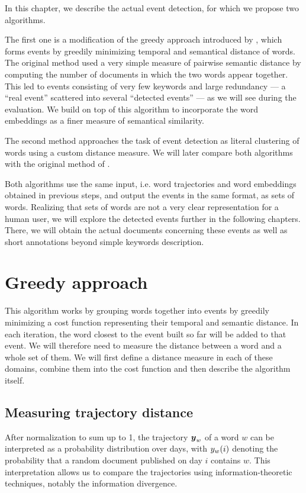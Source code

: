 In this chapter, we describe the actual event detection, for which we propose two algorithms.

The first one is a modification of the greedy approach introduced by \cite{event-detection}, which forms events by greedily minimizing temporal and semantical distance of words. The original method used a very simple measure of pairwise semantic distance by computing the number of documents in which the two words appear together. This led to events consisting of very few keywords and large redundancy --- a ``real event'' scattered into several ``detected events'' --- as we will see during the evaluation. We build on top of this algorithm to incorporate the word embeddings as a finer measure of semantical similarity.

The second method approaches the task of event detection as literal clustering of words using a custom distance measure. We will later compare both algorithms with the original method of \cite{event-detection}.

Both algorithms use the same input, i.e. word trajectories and word embeddings obtained in previous steps, and output the events in the same format, as sets of words. Realizing that sets of words are not a very clear representation for a human user, we will explore the detected events further in the following chapters. There, we will obtain the actual documents concerning these events as well as short annotations beyond simple keywords description.


\section{Greedy approach}
This algorithm works by grouping words together into events by greedily minimizing a cost function representing their temporal and semantic distance. In each iteration, the word closest to the event built so far will be added to that event. We will therefore need to measure the distance between a word and a whole set of them. We will first define a distance measure in each of these domains, combine them into the cost function and then describe the algorithm itself.

\subsection{Measuring trajectory distance}
After normalization to sum up to 1, the trajectory $\vect{\traj}_{w}$ of a word $w$ can be interpreted as a probability distribution over days, with $y_{w}(i)$ denoting the probability that a random document published on day $i$ contains $w$. This interpretation allows us to compare the trajectories using information-theoretic techniques, notably the information divergence.

